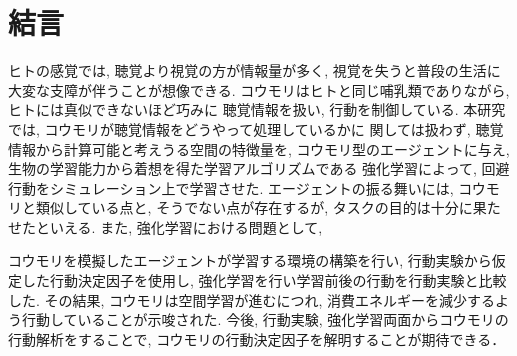 \documentclass[../main]{subfiles}
\begin{document}
\newpage
\chapter*{結言}
\label{chap:summary}
ヒトの感覚では, 聴覚より視覚の方が情報量が多く, 
視覚を失うと普段の生活に大変な支障が伴うことが想像できる.
コウモリはヒトと同じ哺乳類でありながら, 
ヒトには真似できないほど巧みに
聴覚情報を扱い, 行動を制御している.
本研究では, コウモリが聴覚情報をどうやって処理しているかに
関しては扱わず, 
聴覚情報から計算可能と考えうる空間の特徴量を, 
コウモリ型のエージェントに与え, 
生物の学習能力から着想を得た学習アルゴリズムである 
強化学習によって, 回避行動をシミュレーション上で学習させた.
エージェントの振る舞いには, 
コウモリと類似している点と, そうでない点が存在するが, 
タスクの目的は十分に果たせたといえる.
また, 強化学習における問題として, 

コウモリを模擬したエージェントが学習する環境の構築を行い, 
行動実験から仮定した行動決定因子を使用し, 
強化学習を行い学習前後の行動を行動実験と比較した.
その結果, コウモリは空間学習が進むにつれ, 
消費エネルギーを減少するよう行動していることが示唆された.
今後, 行動実験, 強化学習両面からコウモリの行動解析をすることで, 
コウモリの行動決定因子を解明することが期待できる．
\end{document}

